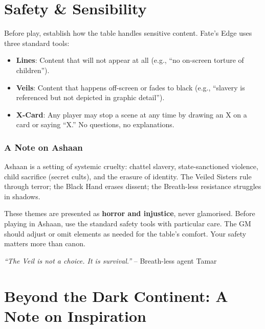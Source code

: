 \documentclass[12pt,oneside]{book}
\begin{document}
\chapter*{Safety \& Sensibility}

Before play, establish how the table handles sensitive content. Fate's Edge uses three standard tools:

\begin{itemize}
  \item \textbf{Lines}: Content that will not appear at all (e.g., ``no on-screen torture of children'').
  \item \textbf{Veils}: Content that happens off-screen or fades to black (e.g., ``slavery is referenced but not depicted in graphic detail'').
  \item \textbf{X-Card}: Any player may stop a scene at any time by drawing an X on a card or saying ``X.'' No questions, no explanations.
\end{itemize}

\subsection*{A Note on Ashaan}
Ashaan is a setting of systemic cruelty: chattel slavery, state-sanctioned violence, child sacrifice (secret cults), and the erasure of identity. The Veiled Sisters rule through terror; the Black Hand erases dissent; the Breath-less resistance struggles in shadows.

These themes are presented as \textbf{horror and injustice}, never glamorised. Before playing in Ashaan, use the standard safety tools with particular care. The GM should adjust or omit elements as needed for the table's comfort. Your safety matters more than canon.

\textit{``The Veil is not a choice. It is survival.''} -- Breath-less agent Tamar

\chapter*{Beyond the Dark Continent: A Note on Inspiration}
\end{document}

